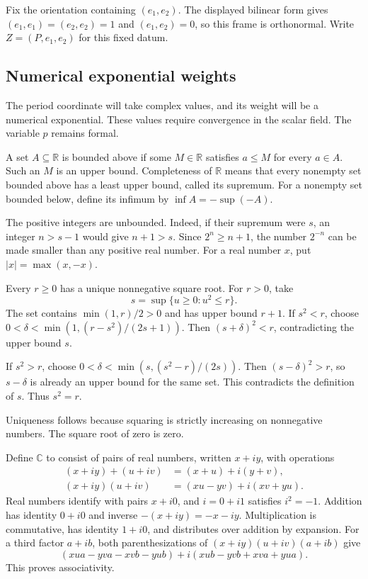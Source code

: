 Fix the orientation containing $(e_1,e_2)$.
The displayed bilinear form gives $(e_1,e_1)=(e_2,e_2)=1$ and
$(e_1,e_2)=0$, so this frame is orthonormal.
Write $Z=(P,e_1,e_2)$ for this fixed datum.

\subsection{Numerical exponential weights}

The period coordinate will take complex values, and its weight will be a
numerical exponential. These values require convergence in the scalar
field. The variable $p$ remains formal.

A set $A\subseteq\mathbb R$ is bounded above if some $M\in\mathbb R$
satisfies $a\leq M$ for every $a\in A$.
Such an $M$ is an upper bound.
Completeness of $\mathbb R$ means that every nonempty set bounded above
has a least upper bound, called its supremum.
For a nonempty set bounded below, define its infimum by
$\inf A=-\sup(-A)$.

The positive integers are unbounded.
Indeed, if their supremum were $s$, an integer $n>s-1$ would give
$n+1>s$. Since $2^n\geq n+1$, the number $2^{-n}$ can be made smaller
than any positive real number.
For a real number $x$, put $|x|=\max(x,-x)$.

Every $r\geq0$ has a unique nonnegative square root.
For $r>0$, take
\[
 s=\sup\{u\geq0:u^2\leq r\}.
\]
The set contains $\min(1,r)/2>0$ and has upper bound $r+1$.
If $s^2<r$, choose
$0<\delta<\min(1,(r-s^2)/(2s+1))$.
Then $(s+\delta)^2<r$, contradicting the upper bound $s$.

If $s^2>r$, choose
$0<\delta<\min(s,(s^2-r)/(2s))$.
Then $(s-\delta)^2>r$, so $s-\delta$ is already an upper bound for the
same set. This contradicts the definition of $s$.
Thus $s^2=r$.

Uniqueness follows because squaring is strictly increasing on
nonnegative numbers. The square root of zero is zero.

Define $\mathbb C$ to consist of pairs of real numbers, written $x+iy$,
with operations
\[
 \begin{aligned}
 (x+iy)+(u+iv)&=(x+u)+i(y+v),\\
 (x+iy)(u+iv)&=(xu-yv)+i(xv+yu).
 \end{aligned}
\]
Real numbers identify with pairs $x+i0$, and $i=0+i1$ satisfies $i^2=-1$.
Addition has identity $0+i0$ and inverse $-(x+iy)=-x-i y$.
Multiplication is commutative, has identity $1+i0$, and distributes over
addition by expansion.
For a third factor $a+ib$, both parenthesizations of
$(x+iy)(u+iv)(a+ib)$ give
\[
 (xua-yva-xvb-yub)+i(xub-yvb+xva+yua).
\]
This proves associativity.

